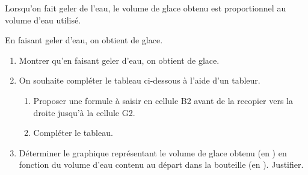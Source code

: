\begin{exercice*}
    Lorsqu’on fait geler de l’eau, le volume de glace obtenu est proportionnel au volume d’eau utilisé.\par 
    En faisant geler  d’eau, on obtient  de glace.
    \begin{enumerate}
	    \item Montrer qu’en faisant geler  d’eau, on obtient  de glace.
	    \item On souhaite compléter le tableau ci-dessous à l’aide d’un tableur.\par\medskip	    
		\begin{enumerate}\medskip
			\item Proposer une formule à saisir en cellule B2 avant de la recopier vers la droite jusqu'à la cellule G2.
			\item Compléter le tableau.
		\end{enumerate}
		\item Déterminer le graphique représentant le volume de glace obtenu (en \Capa[L]{}) en fonction du volume d'eau contenu au départ dans la bouteille (en \Capa[L]{}). Justifier.\par\medskip
		\begin{minipage}{0.3\linewidth}
            \begin{center}
\end{center}
\end{minipage}
\end{enumerate}
\end{exercice*}
